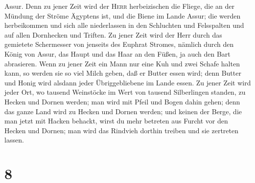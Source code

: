 Assur.  Denn zu jener Zeit wird der \textsc{Herr}
herbeizischen die Fliege, die an der Mündung der Ströme Ägyptens ist,
und die Biene im Lande Assur;  die werden herbeikommen
und sich alle niederlassen in den Schluchten und Felsspalten und auf
allen Dornhecken und Triften.  Zu jener Zeit wird der
Herr durch das gemietete Schermesser von jenseits des Euphrat Stromes,
nämlich durch den König von Assur, das Haupt und das Haar an den Füßen,
ja auch den Bart abrasieren.  Wenn zu jener Zeit ein Mann
nur eine Kuh und zwei Schafe halten kann,  so werden sie
so viel Milch geben, daß er Butter essen wird; denn Butter und Honig
wird alsdann jeder Übriggebliebene im Lande essen.  Zu
jener Zeit wird jeder Ort, wo tausend Weinstöcke im Wert von tausend
Silberlingen standen, zu Hecken und Dornen werden;  man
wird mit Pfeil und Bogen dahin gehen; denn das ganze Land wird zu Hecken
und Dornen werden;  und keinen der Berge, die man jetzt
mit Hacken behackt, wirst du mehr betreten aus Furcht vor den Hecken und
Dornen; man wird das Rindvieh dorthin treiben und sie zertreten lassen.

\hypertarget{section-7}{%
\section{8}\label{section-7}}

